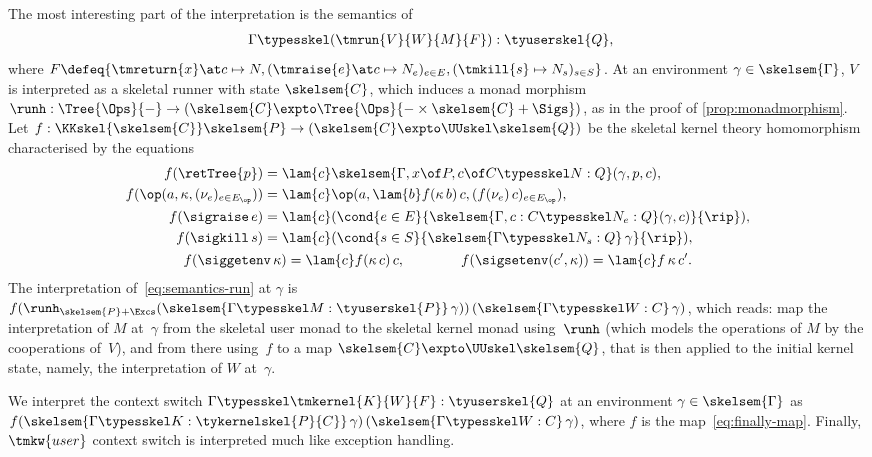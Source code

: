 The most interesting part of the interpretation is the semantics of
%
\begin{align}
  \label{eq:semantics-run}
  & {\Gamma \typesskel (\tmrun{V}{W}{M}{F}) : \tyuserskel{Q}}, 
\end{align}
where $ F \defeq \{ \tmreturn{x} \at c \mapsto N, 
             (\tmraise{e} \at c \mapsto N_e)_{e \in E},
             (\tmkill{s} \mapsto N_s)_{s \in S} \}$.
%
At an environment $\gamma \in \skelsem{\Gamma}$, $V$ is interpreted as a skeletal runner
with state $\skelsem{C}$, which induces a monad morphism
$\runh : \Tree{\Ops}{-} \to (\skelsem{C} \expto \Tree{\Ops}{{-} \times \skelsem{C} + \Sigs})$, 
as in the proof of \cref{prop:monadmorphism}. 
Let
$f : \KKskel{\skelsem{C}} \skelsem{P} \to (\skelsem{C} \expto \UUskel \skelsem{Q})$ be the skeletal
kernel theory homomorphism characterised by the equations
%
\begin{gather}
  \label{eq:finally-map}
  \begin{aligned}
    f(\retTree{p}) &= \lam{c} \skelsem{\Gamma, x \of P, c \of C \typesskel N : Q}(\gamma, p, c), 
    \\
    f(\op(a, \kappa, (\nu_e)_{e \in E_\op})) &= \lam{c} \op(a, \lam{b} f (\kappa \, b) \, c, (f(\nu_e)\, c)_{e \in E_\op}), 
    \\
    f(\sigraise\,e) &= \lam{c}
      (\cond
        {e \in E}
        {\skelsem{\Gamma, c : C \typesskel N_e : Q}(\gamma, c)}
        {\rip}), 
    \\
    f(\sigkill\,s) &= \lam{c}
      (\cond
        {s \in S}
        {\skelsem{\Gamma \typesskel N_s : Q}\,\gamma}
        {\rip}), 
  \end{aligned} 
  \\
 \notag
  f(\siggetenv\,\kappa) = \lam{c} f (\kappa \, c) \, c, 
  \qquad\qquad
  f(\sigsetenv(c', \kappa)) = \lam{c} f \, \kappa \, c'.
\end{gather}
%
The interpretation of~\eqref{eq:semantics-run} at $\gamma$ is
%
$
  f(\runh_{\skelsem{P} + \Excs} (\skelsem{\Gamma \typesskel M : \tyuserskel{P}} \, \gamma))
  \, (\skelsem{\Gamma \typesskel W : C} \, \gamma)
$,
%
which reads: map the interpretation of $M$ at~$\gamma$ from the skeletal user
monad to the skeletal kernel monad using~$\runh$ (which models the operations of $M$ by the
cooperations of~$V$), and from there using~$f$ to a map
$\skelsem{C} \expto \UUskel \skelsem{Q}$, that is then applied to the initial kernel state, namely, the
interpretation of $W$ at~$\gamma$.

We interpret the context switch $\Gamma \typesskel \tmkernel{K}{W}{F} : \tyuserskel{Q}$
at an environment $\gamma \in \skelsem{\Gamma}$
as $f(\skelsem{\Gamma \typesskel K : \tykernelskel{P}{C}} \, \gamma)\,
  (\skelsem{\Gamma \typesskel W : C} \, \gamma)$, where $f$ is the map~\eqref{eq:finally-map}. 
Finally, $\tmkw{user}$ context switch is interpreted much like exception handling.

